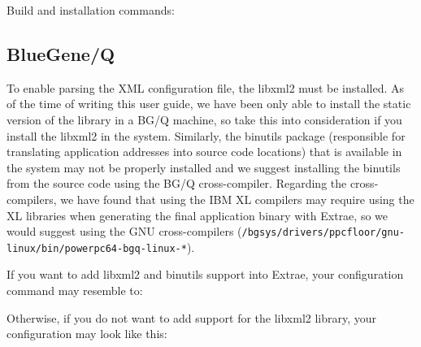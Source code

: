 Build and installation commands:


\subsection{BlueGene/Q}

To enable parsing the XML configuration file, the libxml2 must be installed. As of the time of writing this user guide, we have been only able to install the static version of the library in a BG/Q machine, so take this into consideration if you install the libxml2 in the system.  Similarly, the binutils package (responsible for translating application addresses into source code locations) that is available in the system may not be properly installed and we suggest installing the binutils from the source code using the BG/Q cross-compiler. Regarding the cross-compilers, we have found that using the IBM XL compilers may require using the XL libraries when generating the final application binary with Extrae, so we would suggest using the GNU cross-compilers ({\tt /bgsys/drivers/ppcfloor/gnu-linux/bin/powerpc64-bgq-linux-*}).

If you want to add libxml2 and binutils support into Extrae, your configuration command may resemble to:


Otherwise, if you do not want to add support for the libxml2 library, your configuration may look like this:


